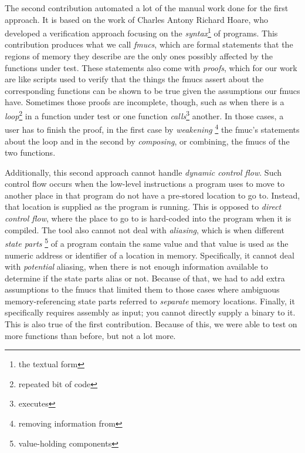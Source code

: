 {  The second contribution automated a lot of the manual work done for the first approach.
  It is based on the work of Charles Antony Richard Hoare, who developed a verification approach focusing on the \emph{syntax}\footnote{the textual form} of programs.
  This contribution produces what we call \emph{\acfp{fmuc}}, which are formal statements that the regions of memory they describe are the only ones possibly affected by the functions under test.
  These statements also come with \emph{proofs}, which for our work are like scripts used to verify that the things the \acsp{fmuc} assert about the corresponding functions can be shown to be true given the assumptions our \acsp{fmuc} have.
  Sometimes those proofs are incomplete, though, such as when there is a \emph{loop}\footnote{repeated bit of code} in a function under test or one function \emph{calls}\footnote{executes} another.
  In those cases, a user has to finish the proof, in the first case by \emph{weakening}%
  \footnote{removing information from}
  the \acs{fmuc}'s statements about the loop and in the second by \emph{composing}, or combining, the \acsp{fmuc} of the two functions.

  Additionally, this second approach cannot handle \emph{dynamic control flow}.
  Such control flow occurs when the low-level instructions a program uses to move to another place in that program do not have a pre-stored location to go to.
  Instead, that location is supplied as the program is running.
  This is opposed to \emph{direct control flow}, where the place to go to is hard-coded into the program when it is compiled.
  The tool also cannot not deal with \emph{aliasing}, which is when different \emph{state parts}%
  \footnote{value-holding components}
  of a program contain the same value and that value is used as the numeric address or identifier of a location in memory.
  Specifically, it cannot deal with \emph{potential} aliasing, when there is not enough information available to determine if the state parts alias or not.
  Because of that, we had to add extra assumptions to the \acsp{fmuc} that limited them to those cases where ambiguous memory-referencing state parts referred to \emph{separate} memory locations.
  Finally, it specifically requires assembly as input; you cannot directly supply a binary to it.
  This is also true of the first contribution.
  Because of this, we were able to test on more functions than before, but not a lot more.

}
